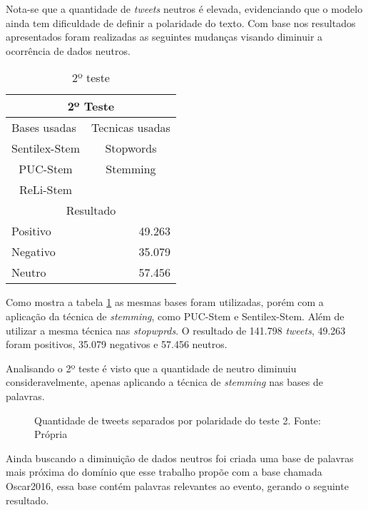 Nota-se que a quantidade de \textit{tweets} neutros é elevada, evidenciando que o modelo ainda tem dificuldade de definir a polaridade do texto. Com base nos resultados apresentados foram realizadas as seguintes mudanças visando diminuir a ocorrência de dados neutros.
 
\begin{table}[H]
	\centering
	\caption{2º teste}
	\label{teste-2}
	\begin{tabular}{|l|l|r}
		\hline
		\multicolumn{3}{|c|}{2º Teste} \\ \hline
		\multicolumn{2}{|l|}{Bases usadas} & \multicolumn{1}{r|}{Tecnicas usadas} \\ \hline
		\multicolumn{2}{|c|}{Sentilex-Stem} & \multicolumn{1}{c|}{Stopwords} \\
		\multicolumn{2}{|c|}{PUC-Stem} & \multicolumn{1}{c|}{Stemming} \\ \cline{3-3} 
		\multicolumn{2}{|c|}{ReLi-Stem} &  \\ \hline
		\multicolumn{3}{|c|}{Resultado} \\ \hline
		\multicolumn{2}{|l|}{Positivo} & \multicolumn{1}{r|}{49.263} \\ \hline
		\multicolumn{2}{|l|}{Negativo} & \multicolumn{1}{r|}{35.079} \\ \hline
		\multicolumn{2}{|l|}{Neutro} & \multicolumn{1}{r|}{57.456} \\ \hline
		
	\end{tabular}
\end{table}

Como mostra a tabela \ref{teste-2} as mesmas bases foram utilizadas, porém com a aplicação da técnica de \textit{stemming}, como  PUC-Stem e Sentilex-Stem. Além de utilizar a mesma técnica nas  \textit{stopwprds}. O resultado de 141.798 \textit{tweets}, 49.263 foram positivos, 35.079 negativos e 57.456 neutros.


Analisando o 2º teste é visto que a quantidade de neutro diminuiu consideravelmente, apenas aplicando a técnica de \textit{stemming} nas bases de palavras.
\begin{figure}[H]
	\centering{}
	\caption{Quantidade de tweets separados por polaridade do teste 2. Fonte: Própria}
	\label{teste-graf-2}
\end{figure}

Ainda buscando a diminuição de dados neutros foi criada uma base de palavras mais próxima do domínio que esse trabalho propõe com a base chamada Oscar2016, essa base contém palavras relevantes ao evento, gerando o seguinte resultado.

